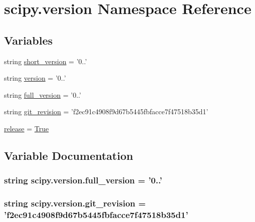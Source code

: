 \hypertarget{namespacescipy_1_1version}{}\section{scipy.\+version Namespace Reference}
\label{namespacescipy_1_1version}
\subsection*{Variables}
\begin{DoxyCompactItemize}
\item 
string \hyperlink{namespacescipy_1_1version_a80df851cbce5d39fb5774261e2ddcd5f}{short\+\_\+version} = '0..'
\item 
string \hyperlink{namespacescipy_1_1version_aa72a021287c47d0c25b60e74640a97ac}{version} = '0..'
\item 
string \hyperlink{namespacescipy_1_1version_ad9b41ddb84e9eae26c237e199a7ca106}{full\+\_\+version} = '0..'
\item 
string \hyperlink{namespacescipy_1_1version_adc5f843f3f8dc4792d9817e240c36945}{git\+\_\+revision} = 'f2ec91c4908f9d67b5445fbfacce7f47518b35d1'
\item 
\hyperlink{namespacescipy_1_1version_a8d7188c228363203bc4d76956fd9b9b5}{release} = \hyperlink{libqhull_8h_add3ca9eefe3b5b754426f51d3043e579}{True}
\end{DoxyCompactItemize}


\subsection{Variable Documentation}
\hypertarget{namespacescipy_1_1version_ad9b41ddb84e9eae26c237e199a7ca106}{}
\subsubsection[{full\+\_\+version}]{\setlength{\rightskip}{0pt plus 5cm}string scipy.\+version.\+full\+\_\+version = '0..'}\label{namespacescipy_1_1version_ad9b41ddb84e9eae26c237e199a7ca106}
\hypertarget{namespacescipy_1_1version_adc5f843f3f8dc4792d9817e240c36945}{}
\subsubsection[{git\+\_\+revision}]{\setlength{\rightskip}{0pt plus 5cm}string scipy.\+version.\+git\+\_\+revision = 'f2ec91c4908f9d67b5445fbfacce7f47518b35d1'}\label{namespacescipy_1_1version_adc5f843f3f8dc4792d9817e240c36945}
\hypertarget{namespacescipy_1_1version_a8d7188c228363203bc4d76956fd9b9b5}{}
